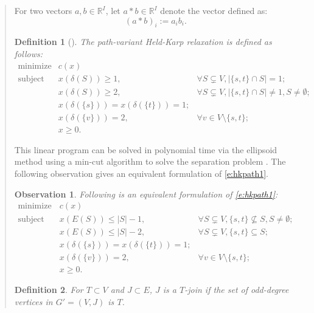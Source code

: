 \documentclass[11pt,letterpaper]{article}
\newtheorem{defn}{Definition}
\newtheorem{obs}{Observation}
\begin{document}
\begin{quote}
For two vectors $a,b\in\mathbb{R}^I$, let $a\ast b\in\mathbb{R}^I$ denote the vector defined as:\[
(a\ast b)_i := a_i b_i
.\]

\begin{defn}[\cite{HK}]
\label{d:hkpath}
The \emph{path-variant Held-Karp relaxation} is defined as follows:\begin{equation}\label{e:hkpath1}
\begin{array}{lll}
\textrm{minimize}&c(x)&\\
\textrm{subject to}&x(\delta(S))\geq 1,&\forall S\subsetneq V, |\{s,t\}\cap S| = 1;\\
&x(\delta(S))\geq 2,&\forall S\subsetneq V, |\{s,t\}\cap S| \neq 1, S\neq\emptyset ;\\
&x(\delta(\{s\})) = x(\delta(\{t\})) = 1;&\\
&x(\delta(\{v\})) = 2,&\forall v\in V\setminus\{s,t\};\\
&x\geq 0.&
\end{array}
\end{equation}
\end{defn}

This linear program can be solved in polynomial time via the ellipsoid method using a min-cut algorithm to solve the separation problem \cite{GLS}. The following observation gives an equivalent formulation of \eqref{e:hkpath1}.

\begin{obs}
\label{o:hkequiv}
Following is an equivalent formulation of \eqref{e:hkpath1}:\begin{equation*}
\begin{array}{lll}
\textrm{minimize}&c(x)&\\
\textrm{subject to}&x(E(S))\leq |S|-1,&\forall S\subsetneq V, \{s,t\} \not\subseteq S, S\neq\emptyset;\\
&x(E(S))\leq |S|-2,&\forall S\subsetneq V, \{s,t\} \subseteq S;\\
&x(\delta(\{s\})) = x(\delta(\{t\})) = 1;&\\
&x(\delta(\{v\})) = 2,&\forall v\in V\setminus\{s,t\};\\
&x\geq 0.&
\end{array}
\end{equation*}
\end{obs}

\begin{defn}
For $T\subset V$ and $J\subset E$, $J$ is a \emph{$T$-join} if the set of odd-degree vertices in $G'=(V,J)$ is $T$.
\end{defn}


\end{quote}
\end{document}
